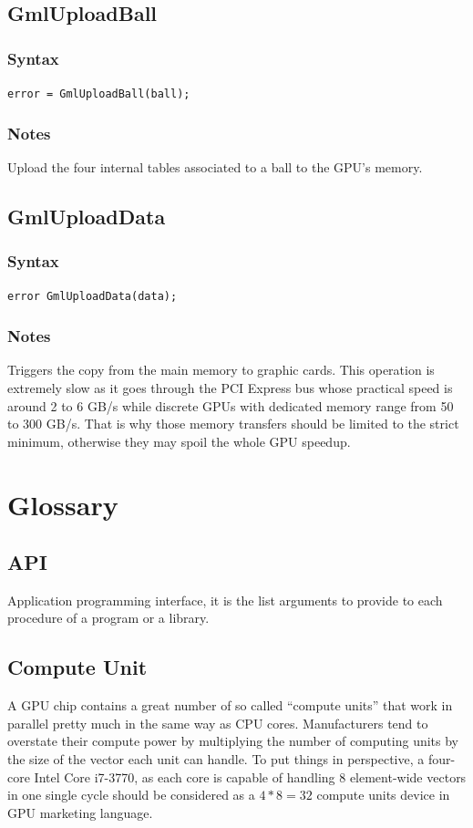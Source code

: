 \documentclass[a4paper,12pt]{article}
\begin{document}
\subsection{GmlUploadBall}
\subsubsection*{Syntax}
{\tt error = GmlUploadBall(ball);}
\subsubsection*{Notes}
Upload the four internal tables associated to a ball to the GPU's memory.


\subsection{GmlUploadData}
\subsubsection*{Syntax}
{\tt error GmlUploadData(data);}
\subsubsection*{Notes}
Triggers the copy from the main memory to graphic cards. This operation is extremely slow as it goes through the PCI Express bus whose practical speed is around 2 to 6 GB/s while discrete GPUs with dedicated memory range from 50 to 300 GB/s. That is why those memory transfers should be limited to the strict minimum, otherwise they may spoil the whole GPU speedup.


%
%


\section{Glossary}

\subsection{API}
Application programming interface, it is the list arguments to provide to each procedure of a program or a library.

\subsection{Compute Unit}
A GPU chip contains a great number of so called ``compute units'' that work in parallel pretty much in the same way as CPU  cores. Manufacturers tend to overstate their compute power by multiplying the number of computing units by the size of the vector each unit can handle. To put things in perspective, a four-core Intel Core i7-3770, as each core is capable of handling 8 element-wide vectors in one single cycle should be considered as a $4*8 = 32$ compute units device in GPU marketing language.
\end{document}
